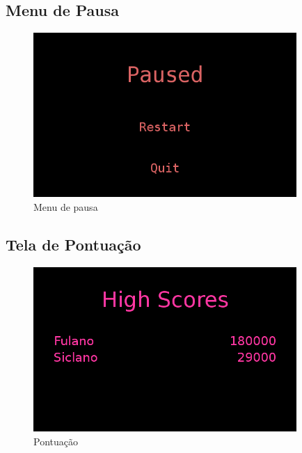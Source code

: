 \documentclass[12pt]{article}
\begin{document}
\subsection{Menu de Pausa}

\begin{figure}[H]
        \centering
        \includegraphics[width=100mm]{pauseMenu.png}
        \caption{Menu de pausa}
        \label{pm}
\end{figure}

\subsection{Tela de Pontuação}

\begin{figure}[H]
        \centering
        \includegraphics[width=100mm]{highScores.png}
        \caption{Pontuação}
        \label{hs}
\end{figure}


\end{document}
